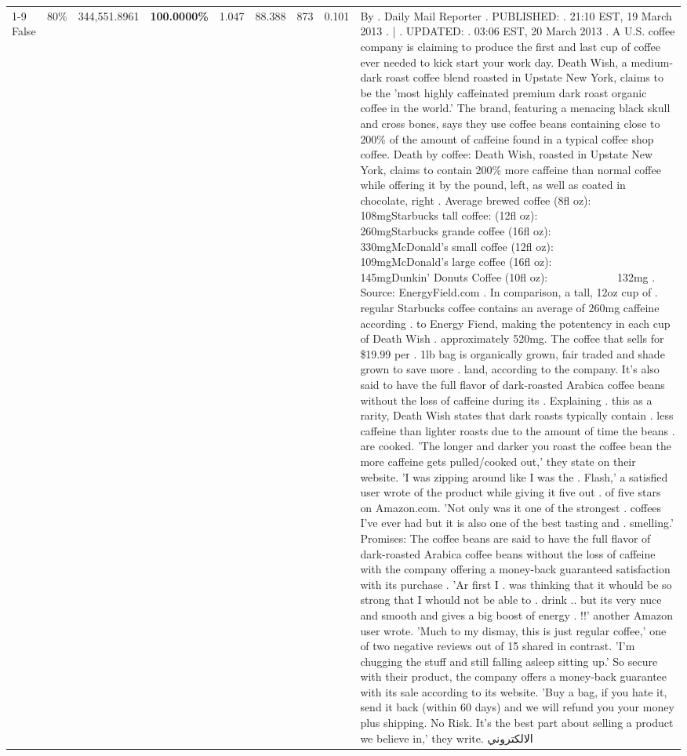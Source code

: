 \begin{table}[H]
{\begin{tabular}{lllrlllll}
\cline{1-9} \cline{2-9}
False & 80\% & 344,551.8961 & \bfseries \color{red} 100.0000\% & 1.047 & 88.388 & 873 & 0.101 & By . Daily Mail Reporter . PUBLISHED: . 21:10 EST, 19 March 2013 . | . UPDATED: . 03:06 EST, 20 March 2013 . A U.S. coffee company is claiming to produce the first and last cup of coffee ever needed to kick start your work day. Death Wish, a medium-dark roast coffee blend roasted in Upstate New York, claims to be the 'most highly caffeinated premium dark roast organic coffee in the world.' The brand, featuring a menacing black skull and cross bones, says they use coffee beans containing close to 200\% of the amount of caffeine found in a typical coffee shop coffee. Death by coffee: Death Wish, roasted in Upstate New York, claims to contain 200\% more caffeine than normal coffee while offering it by the pound, left, as well as coated in chocolate, right . Average brewed coffee (8fl oz):              108mgStarbucks tall coffee: (12fl oz):                260mgStarbucks grande coffee (16fl oz):         330mgMcDonald's small coffee (12fl oz):           109mgMcDonald's large coffee (16fl oz):           145mgDunkin' Donuts Coffee (10fl oz):             132mg . Source: EnergyField.com . In comparison, a tall, 12oz cup of . regular Starbucks coffee contains an average of 260mg caffeine according . to Energy Fiend, making the potentency in each cup of Death Wish . approximately 520mg. The coffee that sells for \$19.99 per . 1lb bag is organically grown, fair traded and shade grown to save more . land, according to the company. It's also said to have the full flavor of dark-roasted Arabica coffee beans without the loss of caffeine during its . Explaining . this as a rarity, Death Wish states that dark roasts typically contain . less caffeine than lighter roasts due to the amount of time the beans . are cooked. 'The longer and darker you roast the coffee bean the more caffeine gets pulled/cooked out,' they state on their website. 'I was zipping around like I was the . Flash,' a satisfied user wrote of the product while giving it five out . of five stars on Amazon.com. 'Not only was it one of the strongest . coffees I've ever had but it is also one of the best tasting and . smelling.’ Promises: The coffee beans are said to have the full flavor of dark-roasted Arabica coffee beans without the loss of caffeine with the company offering a money-back guaranteed satisfaction with its purchase . 'Ar first I . was thinking that it whould be so strong that I whould not be able to . drink .. but its very nuce and smooth and gives a big boost of energy . !!' another Amazon user wrote. 'Much to my dismay, this is just regular coffee,' one of two negative reviews out of 15 shared in contrast. 'I'm chugging the stuff and still falling asleep sitting up.' So secure with their product, the company offers a money-back guarantee with its sale according to its website. 'Buy a bag, if you hate it, send it back (within 60 days) and we will refund you your money plus shipping. No Risk. It’s the best part about selling a product we believe in,' they write. الالكتروني \\

\end{tabular}}
\end{table}
